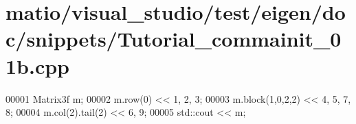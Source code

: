 \hypertarget{matio_2visual__studio_2test_2eigen_2doc_2snippets_2_tutorial__commainit__01b_8cpp_source}{}\section{matio/visual\+\_\+studio/test/eigen/doc/snippets/\+Tutorial\+\_\+commainit\+\_\+01b.cpp}
\label{matio_2visual__studio_2test_2eigen_2doc_2snippets_2_tutorial__commainit__01b_8cpp_source}

\begin{DoxyCode}
00001 Matrix3f m;
00002 m.row(0) << 1, 2, 3;
00003 m.block(1,0,2,2) << 4, 5, 7, 8;
00004 m.col(2).tail(2) << 6, 9;           
00005 std::cout << m;
\end{DoxyCode}
